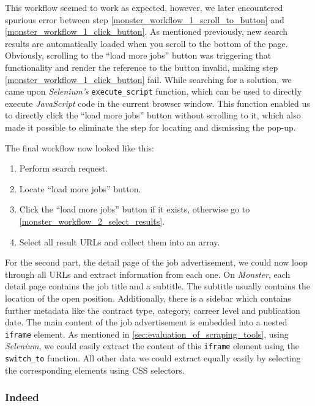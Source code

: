 \documentclass[runningheads]{llncs}
\begin{document}
This workflow seemed to work as expected, however, we later encountered spurious error between step \ref{monster_workflow_1_scroll_to_button} and \ref{monster_workflow_1_click_button}. As mentioned previously, new search results are automatically loaded when you scroll to the bottom of the page. Obviously, scrolling to the “load more jobs” button was triggering that functionality and render the reference to the button invalid, making step \ref{monster_workflow_1_click_button} fail. While searching for a solution, we came upon \textit{Selenium's} \texttt{execute\_script} function, which can be used to directly execute \textit{JavaScript} code in the current browser window. This function enabled us to directly click the “load more jobs” button without scrolling to it, which also made it possible to eliminate the step for locating and dismissing the pop-up.

The final workflow now looked like this:

\begin{enumerate}
  \item Perform search request.
  \item Locate “load more jobs” button.
  \item Click the “load more jobs” button if it exists, otherwise go to \ref{monster_workflow_2_select_results}.
  \item \label{monster_workflow_2_select_results}
    Select all result URLs and collect them into an array.
\end{enumerate}

For the second part, the detail page of the job advertisement, we could now loop through all URLs and extract information from each one. On \textit{Monster}, each detail page contains the job title and a subtitle. The subtitle usually contains the location of the open position. Additionally, there is a sidebar which contains further metadata like the contract type, category, carreer level and publication date. The main content of the job advertisement is embedded into a nested \texttt{iframe} element. As mentioned in \autoref{sec:evaluation_of_scraping_tools}, using \textit{Selenium}, we could easily extract the content of this \texttt{iframe} element using the \texttt{switch\_to} function. All other data we could extract equally easily by selecting the corresponding elements using CSS selectors.

\subsubsection{Indeed}
\label{subsub:indeed}
\end{document}
